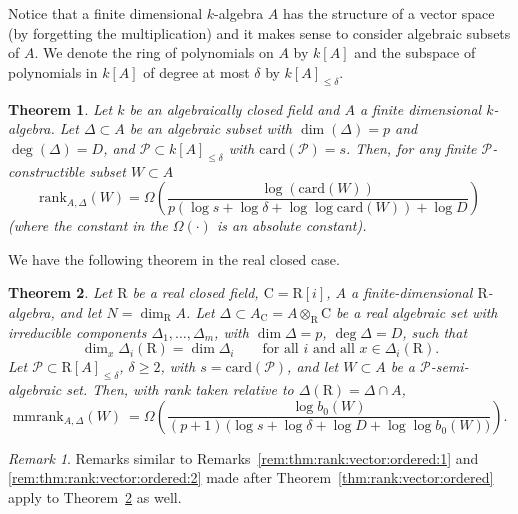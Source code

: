 \documentclass[10pt]{amsart}
\newtheorem{theorem}{Theorem}
\theoremstyle{definition}
\theoremstyle{remark}
\newtheorem{remark}{Remark}
\numberwithin{equation}{section}
\newcommand {\R} {\mathrm{R}}
\newcommand {\C}     {\mathrm{C}}
\newcommand{\card}{\mathrm{card}}
\newcommand{\rank}{\mathrm{rank}}
\newcommand{\mmrank}{\mathrm{mmrank}}
\begin{document}
Notice that a finite dimensional $k$-algebra $A$ has the structure of a vector space (by forgetting the 
multiplication) and it makes sense to consider algebraic subsets  of $A$. We denote the ring of polynomials on 
$A$ by $k[A]$ and the subspace of polynomials in $k[A]$ of degree at most $\delta$ by $k[A]_{\leq \delta}$.



\begin{theorem}
\label{thm:rank:algebra:algebraic}
Let $k$ be an algebraically closed field and $A$ a finite dimensional $k$-algebra.
Let $\Delta \subset A$ be an algebraic subset with $\dim(\Delta) = p$ and $\deg(\Delta)  = D$, and 
$\mathcal{P} \subset k[A]_{\leq \delta}$ with $\card(\mathcal{P}) = s$.
Then, for any finite $\mathcal{P}$-constructible subset $W \subset A$ 
\begin{equation}
\label{eqn:thm:rank:algebra:algebraic}
\rank_{A,\Delta} (W) =  \Omega \left(\frac{\log(\card(W))}{p(\log s + \log \delta + \log \log \card(W)) + \log D }\right)
\end{equation}
(where the constant in the $\Omega(\cdot)$ is an absolute constant).
\end{theorem}



We have the following theorem in the real closed case.


\begin{theorem}
\label{thm:rank:algebra:ordered}
Let $\R$ be a real closed field, $\C=\R[i]$,
$A$ a finite-dimensional $\R$-algebra, and
let $N=\dim_\R A$. Let $\Delta\subset A_\C=A\otimes_\R \C$ be a real algebraic set with irreducible components $\Delta_1,\dots,\Delta_m$, 
with $\dim\Delta=p$, $\deg\Delta=D$, such that
\[
\dim_x\Delta_i(\R)=\dim\Delta_i\qquad\text{for all $i$ and all }x\in\Delta_i(\R).
\]
Let $\mathcal{P} \subset \R[A]_{\leq \delta}$, $\delta \geq 2$, with $s=\card(\mathcal{P})$, and let $W\subset A$ be a $\mathcal{P}$-semi-algebraic set. 
Then, with rank taken relative to $\Delta(\R)=\Delta\cap A$,
\begin{equation}
\label{eqn:thm:rank:algebra:ordered}
\mmrank_{A,\Delta}(W)\ =  \Omega\left(\frac{\log b_0(W)}{(p+1)\,\bigl(\log s+\log\delta+\log D+\log\log b_0(W)\bigr)}\right).
\end{equation}
\end{theorem}

\begin{remark}
Remarks similar to 
Remarks~\ref{rem:thm:rank:vector:ordered:1} and \ref{rem:thm:rank:vector:ordered:2} made after Theorem~\ref{thm:rank:vector:ordered} apply to Theorem~\ref{thm:rank:algebra:ordered} as well.
\end{remark}
\end{document}
